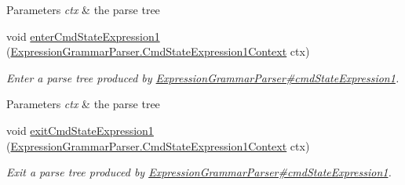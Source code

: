 \begin{DoxyCompactItemize}
\begin{DoxyCompactList}
\begin{DoxyParams}{Parameters}
{\em ctx} & the parse tree\\
\hline
\end{DoxyParams}
 \end{DoxyCompactList}\item 
void \hyperlink{classgov_1_1nasa_1_1jpf_1_1inspector_1_1server_1_1expression_1_1parser_1_1_expression_grammar_base_listener_a36bc94d94b371683a42a85f25c8dfca7}{enter\+Cmd\+State\+Expression1} (\hyperlink{classgov_1_1nasa_1_1jpf_1_1inspector_1_1server_1_1expression_1_1parser_1_1_expression_grammar_pa1eb341e049a8047f26aa8b84266a8b94}{Expression\+Grammar\+Parser.\+Cmd\+State\+Expression1\+Context} ctx)
\begin{DoxyCompactList}\small\item\em Enter a parse tree produced by \hyperlink{classgov_1_1nasa_1_1jpf_1_1inspector_1_1server_1_1expression_1_1parser_1_1_expression_grammar_parser_a1497794a3a59d8319803998a35dbb16e}{Expression\+Grammar\+Parser\#cmd\+State\+Expression1}.


\begin{DoxyParams}{Parameters}
{\em ctx} & the parse tree\\
\hline
\end{DoxyParams}
 \end{DoxyCompactList}\item 
void \hyperlink{classgov_1_1nasa_1_1jpf_1_1inspector_1_1server_1_1expression_1_1parser_1_1_expression_grammar_base_listener_accd53e809263e03b157fce79333eb356}{exit\+Cmd\+State\+Expression1} (\hyperlink{classgov_1_1nasa_1_1jpf_1_1inspector_1_1server_1_1expression_1_1parser_1_1_expression_grammar_pa1eb341e049a8047f26aa8b84266a8b94}{Expression\+Grammar\+Parser.\+Cmd\+State\+Expression1\+Context} ctx)
\begin{DoxyCompactList}\small\item\em Exit a parse tree produced by \hyperlink{classgov_1_1nasa_1_1jpf_1_1inspector_1_1server_1_1expression_1_1parser_1_1_expression_grammar_parser_a1497794a3a59d8319803998a35dbb16e}{Expression\+Grammar\+Parser\#cmd\+State\+Expression1}.



\end{DoxyCompactList}
\end{DoxyCompactItemize}
